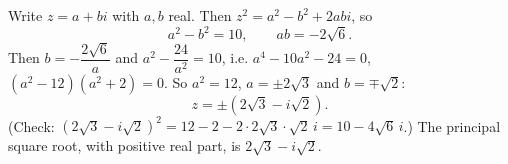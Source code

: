 Write $z=a+bi$ with $a,b$ real. Then $z^2=a^2-b^2+2abi$, so
\[a^2-b^2=10,\qquad ab=-2\sqrt6 .\]
Then $b=-\dfrac{2\sqrt6}{a}$ and $a^2-\dfrac{24}{a^2}=10$, i.e. $a^4-10a^2-24=0$, $(a^2-12)(a^2+2)=0$. So $a^2=12$, $a=\pm2\sqrt3$ and $b=\mp\sqrt2$:
\[z=\boxed{\pm\left(2\sqrt3-i\sqrt2\right)}.\]
(Check: $(2\sqrt3-i\sqrt2)^2=12-2-2\cdot2\sqrt3\cdot\sqrt2\,i=10-4\sqrt6\,i$.) The principal square root, with positive real part, is $2\sqrt3-i\sqrt2$.
